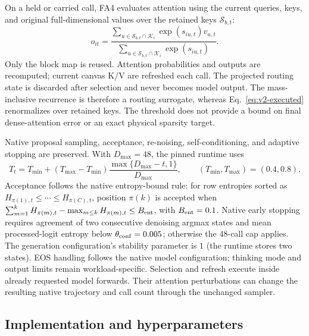 \documentclass[10pt]{article}
\begin{document}
On a held or carried call, FA4 evaluates attention using the current
queries, keys, and original full-dimensional values over the retained keys
$\mathcal S_{b,t}$:
\begin{equation}
 o_{it}=\frac{\sum_{u\in\mathcal S_{b,t}\cap\mathcal K_i}
                     \exp(s_{iu,t})v_{u,t}}
                  {\sum_{u\in\mathcal S_{b,t}\cap\mathcal K_i}
                     \exp(s_{iu,t})}.
 \label{eq:v2-executed}
\end{equation}
Only the block map is reused. Attention probabilities and outputs are
recomputed; current canvas K/V are refreshed each call. The projected
routing state is discarded after selection and never becomes model output.
The mass-inclusive recurrence is therefore a routing surrogate, whereas
Eq.~\eqref{eq:v2-executed} renormalizes over retained keys. The threshold
does not provide a bound on final dense-attention error or an exact physical
sparsity target.

Native proposal sampling, acceptance, re-noising, self-conditioning, and
adaptive stopping are preserved. With $D_{\max}=48$, the pinned runtime uses
\begin{equation}
 T_t=T_{\min}+(T_{\max}-T_{\min})
       \frac{\max\{D_{\max}-t,1\}}{D_{\max}},
 \qquad (T_{\min},T_{\max})=(0.4,0.8).
 \label{eq:v2-temperature}
\end{equation}
Acceptance follows the native entropy-bound rule: for row entropies sorted
as $H_{\pi(1),t}\le\cdots\le H_{\pi(C),t}$, position $\pi(k)$ is accepted
when $\sum_{m=1}^{k}H_{\pi(m),t}-\max_{m\le k}H_{\pi(m),t}\le B_{\rm ent}$,
with $B_{\rm ent}=0.1$. Native early stopping requires agreement of two
consecutive denoising argmax states and mean processed-logit entropy below
$\theta_{\rm conf}=0.005$; otherwise the $48$-call cap applies. The generation
configuration's stability parameter is $1$ (the runtime stores two states).
EOS handling follows the native model configuration; thinking mode and
output limits remain workload-specific. Selection and refresh execute
inside already requested model forwards. Their attention perturbations can
change the resulting native trajectory and call count through the unchanged
sampler.

\subsection{Implementation and hyperparameters}
\label{sec:v2-implementation}
\end{document}
